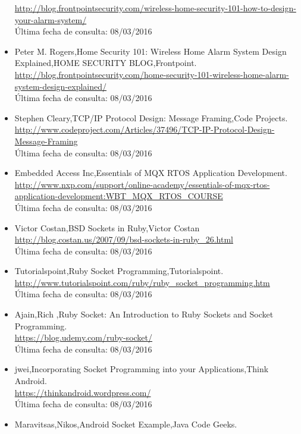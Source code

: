\begin{itemize}
	\href{url}{http://blog.frontpointsecurity.com/wireless-home-security-101-how-to-design-your-alarm-system/}\\
	Última fecha de consulta: 	08/03/2016
\item Peter M. Rogers,Home Security 101: Wireless Home Alarm System Design Explained,HOME SECURITY BLOG,Frontpoint.\\
	 \href{url}{http://blog.frontpointsecurity.com/home-security-101-wireless-home-alarm-system-design-explained/}\\
	Última fecha de consulta: 	 08/03/2016
\item Stephen Cleary,TCP/IP Protocol Design: Message Framing,Code Projects.\\
	 \href{url}{http://www.codeproject.com/Articles/37496/TCP-IP-Protocol-Design-Message-Framing}\\
	Última fecha de consulta: 	 08/03/2016
\item Embedded Access Inc,Essentials of MQX RTOS Application Development.\\
	 \href{url}{http://www.nxp.com/support/online-academy/essentials-of-mqx-rtos-application-development:WBT\_MQX\_RTOS\_COURSE}\\
	Última fecha de consulta: 	 08/03/2016
\item Victor Costan,BSD Sockets in Ruby,Victor Costan\\	
	\href{url}{http://blog.costan.us/2007/09/bsd-sockets-in-ruby\_26.html}\\
	Última fecha de consulta: 	08/03/2016
\item Tutorialspoint,Ruby Socket Programming,Tutorialspoint.\\
	 \href{url}{http://www.tutorialspoint.com/ruby/ruby\_socket\_programming.htm}\\
	Última fecha de consulta: 	 08/03/2016
\item Ajain,Rich ,Ruby Socket: An Introduction to Ruby Sockets and Socket Programming.\\
	 \href{url}{https://blog.udemy.com/ruby-socket/}\\
	Última fecha de consulta: 	 08/03/2016
\item jwei,Incorporating Socket Programming into your Applications,Think Android.\\
	 \href{url}{https://thinkandroid.wordpress.com/}\\
	Última fecha de consulta: 	 08/03/2016
\item Maravitsas,Nikos,Android Socket Example,Java Code Geeks.\\

\end{itemize}
